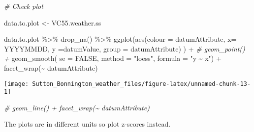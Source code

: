 \documentclass{article}
\newenvironment{Shaded}{\begin{snugshade}}{\end{snugshade}}
\newcommand{\AttributeTok}[1]{\textcolor[rgb]{0.77,0.63,0.00}{#1}}
\newcommand{\CommentTok}[1]{\textcolor[rgb]{0.56,0.35,0.01}{\textit{#1}}}
\newcommand{\ConstantTok}[1]{\textcolor[rgb]{0.00,0.00,0.00}{#1}}
\newcommand{\FunctionTok}[1]{\textcolor[rgb]{0.00,0.00,0.00}{#1}}
\newcommand{\NormalTok}[1]{#1}
\newcommand{\OtherTok}[1]{\textcolor[rgb]{0.56,0.35,0.01}{#1}}
\newcommand{\SpecialCharTok}[1]{\textcolor[rgb]{0.00,0.00,0.00}{#1}}
\newcommand{\StringTok}[1]{\textcolor[rgb]{0.31,0.60,0.02}{#1}}
\begin{document}
\begin{Shaded}
\begin{Highlighting}[]
\CommentTok{\# Check plot}

\NormalTok{data.to.plot }\OtherTok{\textless{}{-}}\NormalTok{ VC55.weather.ss}

\NormalTok{data.to.plot }\SpecialCharTok{\%\textgreater{}\%} \FunctionTok{drop\_na}\NormalTok{() }\SpecialCharTok{\%\textgreater{}\%}
\FunctionTok{ggplot}\NormalTok{(}\FunctionTok{aes}\NormalTok{(}\AttributeTok{colour =}\NormalTok{ datumAttribute, }\AttributeTok{x=}\NormalTok{ YYYYMMDD, }\AttributeTok{y =}\NormalTok{datumValue, }\AttributeTok{group =}\NormalTok{ datumAttribute) ) }\SpecialCharTok{+} 
 \CommentTok{\# geom\_point() +}
  \FunctionTok{geom\_smooth}\NormalTok{( }\AttributeTok{se =} \ConstantTok{FALSE}\NormalTok{, }\AttributeTok{method =} \StringTok{"loess"}\NormalTok{, }\AttributeTok{formula =} \StringTok{"y \textasciitilde{} x"}\NormalTok{) }\SpecialCharTok{+}
  \FunctionTok{facet\_wrap}\NormalTok{(}\SpecialCharTok{\textasciitilde{}}\NormalTok{ datumAttribute)}
\end{Highlighting}
\end{Shaded}

\begin{center}\texttt{[image: Sutton\_Bonnington\_weather\_files/figure-latex/unnamed-chunk-13-1]} \end{center}

\begin{Shaded}
\begin{Highlighting}[]
 \CommentTok{\#   geom\_line() + facet\_wrap(\textasciitilde{} datumAttribute)}
\end{Highlighting}
\end{Shaded}

The plots are in different units so plot z-scores instead.
\end{document}
